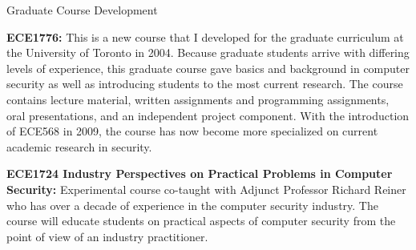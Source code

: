 \documentclass[10pt]{article}
\newenvironment{lonelist}[1][\enskip\textbullet]%
        {\vspace{-\baselineskip}\begin{list}{#1}{%
        \setlength{\partopsep}{0pt}%
        \setlength{\topsep}{0pt}
	\setlength{\leftmargin}{0pt}}}
        {\end{list}\vspace{-.6\baselineskip}}
\newenvironment{innerlist}[1][\enskip\textbullet]%
        {\begin{compactitem}[#1]}{\end{compactitem}}
\begin{document}
\begin{lonelist}
\begin{longtable}[h]{|l|l|p{190pt}|r|}
\end{longtable}
\item[] {Graduate Course Development}
\begin{innerlist}
\item[] {\bf ECE1776:} This is a new course that I developed for the graduate curriculum at the University of Toronto in 2004.  Because graduate students arrive with differing levels of experience, this graduate course gave basics and background in computer security as well as introducing students to the most current research.  The course contains lecture material, written assignments and programming assignments, oral presentations, and an independent project component. With the introduction of ECE568 in 2009, the course has now become more specialized on current academic research in security.
\item[] {\bf ECE1724 Industry Perspectives on Practical Problems in Computer Security:} Experimental course co-taught with Adjunct Professor Richard Reiner who has over a decade of experience in the computer security industry.  The course will educate students on practical aspects of computer security from the point of view of an industry practitioner.
\end{innerlist}


\end{lonelist}
\end{document}
